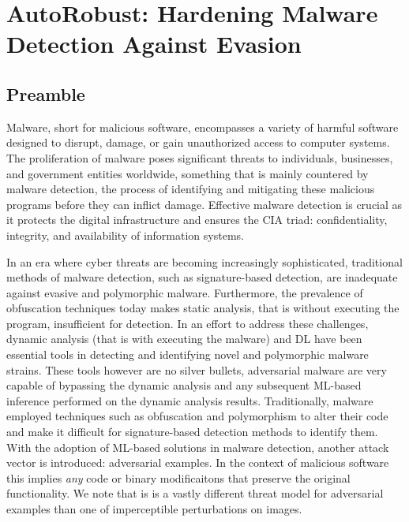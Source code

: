 \chapter{AutoRobust: Hardening Malware Detection Against Evasion}\label{ch:autorobust}

\section*{Preamble}

Malware, short for malicious software, encompasses a variety of harmful software designed to disrupt, damage, or gain unauthorized access to computer systems.
The proliferation of malware poses significant threats to individuals, businesses, and government entities worldwide, something that is mainly countered by malware detection, the process of identifying and mitigating these malicious programs before they can inflict damage.
Effective malware detection is crucial as it protects the digital infrastructure and ensures the CIA triad: confidentiality, integrity, and availability of information systems.

In an era where cyber threats are becoming increasingly sophisticated, traditional methods of malware detection, such as signature-based detection, are inadequate against evasive and polymorphic malware.
Furthermore, the prevalence of obfuscation techniques today makes static analysis, that is without executing the program, insufficient for detection.
In an effort to address these challenges, dynamic analysis (that is with executing the malware) and \gls{DL} have been essential tools in detecting and identifying novel and polymorphic malware strains.
These tools however are no silver bullets, adversarial malware are very capable of bypassing the dynamic analysis and any subsequent ML-based inference performed on the dynamic analysis results.
Traditionally, malware employed techniques such as obfuscation and polymorphism to alter their code and make it difficult for signature-based detection methods to identify them.
With the adoption of ML-based solutions in malware detection,
another attack vector is introduced: adversarial examples.
In the context of malicious software this implies \textit{any} code or binary modificaitons that preserve the original functionality.
We note that is is a vastly different threat model for adversarial examples than one of imperceptible perturbations on images.

